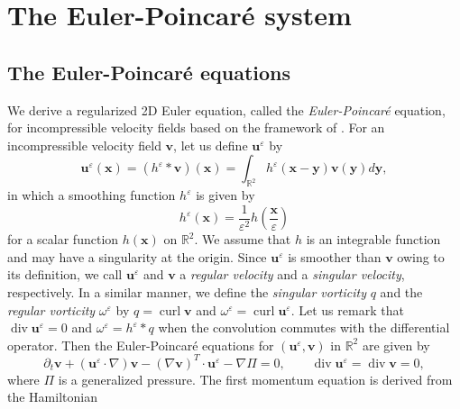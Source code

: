\documentclass{article}
\theoremstyle{definition}
\begin{document}
\section{The Euler-Poincar\'{e} system }
\subsection{The Euler-Poincar\'{e} equations}
\label{EP-eq}
We derive a regularized 2D Euler equation, called the \textit{Euler-Poincar\'e} equation,  for incompressible velocity fields based on the framework of \cite{Foias(a), Holm(c)}. 
For an incompressible velocity field ${\bm v}$, let
us define ${\bm u}^\varepsilon$ by 
\begin{equation}
{\bm u}^\varepsilon({\bm x}) = \left( h^\varepsilon \ast {\bm v} \right) ({\bm x}) = \int_{\mathbb{R}^2} h^\varepsilon\left( {\bm x} - {\bm y} \right) {\bm v}({\bm y}) d{\bm y}, \label{Rvelo}
\end{equation}
in which a smoothing function $h^\varepsilon$ is  given by 
\begin{equation}
h^\varepsilon({\bm x}) = \frac{1}{\varepsilon^2} h\left( \frac{{\bm x}} {\varepsilon} \right)    \label{h_eps-h}
\end{equation}
for a scalar function $h({\bm x})$ on $\mathbb{R}^2$. We assume that $h$ is an integrable function and may have a singularity at the origin. 
Since ${\bm u}^\varepsilon$ is smoother than ${\bm v}$ owing to its definition, we call ${\bm u}^\varepsilon$ and ${\bm v}$ a \textit{regular velocity} and
 a \textit{singular velocity}, respectively. In a similar manner, we define the \textit{singular vorticity} $q$ and the \textit{regular vorticity} $\omega^\varepsilon$ by
$q = \operatorname{curl} {\bm v}$ and $\omega^\varepsilon = \operatorname{curl} {\bm u}^\varepsilon$.
Let us remark that $\operatorname{div} {\bm u}^\varepsilon = 0$ and $\omega^\varepsilon = h^\varepsilon \ast q$ when the convolution commutes with the differential operator.
 Then the Euler-Poincar\'{e} equations for $({\bm u}^\varepsilon, {\bm v})$ in $\mathbb{R}^2$ are given by
 \begin{equation}
\partial_t {\bm v} + ({\bm u}^\varepsilon \cdot \nabla) {\bm v} - (\nabla {\bm v})^T \cdot {\bm u}^\varepsilon - \nabla \Pi = 0,\qquad  \operatorname{div} {\bm u}^\varepsilon = \operatorname{div} {\bm v}=0, \label{REE}
\end{equation}
where $\Pi$ is a generalized pressure. The first momentum equation is derived from the Hamiltonian
\end{document}
